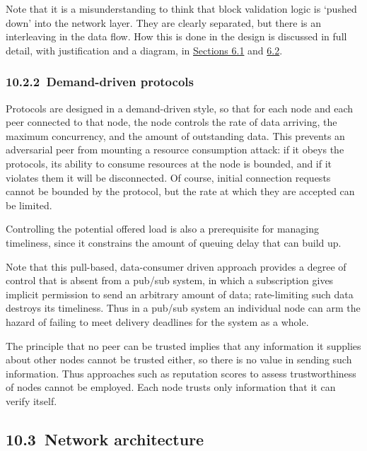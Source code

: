 \documentclass[11pt,a4paper]{article}
\begin{document}
Note that it is a misunderstanding to think that block validation logic
is `pushed down' into the network layer. They are clearly separated, but
there is an interleaving in the data flow. How this is done in the
design is discussed in full detail, with justification and a diagram, in
\protect\hyperlink{consensus-constraints-and-design-decisions}{{Sections
6.1}} and \protect\hyperlink{consensus-components}{{6.2}}.

\hypertarget{demand-driven-protocols}{%
\subsubsection{​10.2.2​~Demand-driven
protocols}\label{demand-driven-protocols}}

Protocols are designed in a demand-driven style, so that for each node
and each peer connected to that node, the node controls the rate of data
arriving, the maximum concurrency, and the amount of outstanding data.
This prevents an adversarial peer from mounting a resource consumption
attack: if it obeys the protocols, its ability to consume resources at
the node is bounded, and if it violates them it will be disconnected. Of
course, initial connection requests cannot be bounded by the protocol,
but the rate at which they are accepted can be limited.

Controlling the potential offered load is also a prerequisite for
managing timeliness, since it constrains the amount of queuing delay
that can build up.

Note that this pull-based, data-consumer driven approach provides a
degree of control that is absent from a pub/sub system, in which a
subscription gives implicit permission to send an arbitrary amount of
data; rate-limiting such data destroys its timeliness. Thus in a pub/sub
system an individual node can arm the hazard of failing to meet delivery
deadlines for the system as a whole.

The principle that no peer can be trusted implies that any information
it supplies about other nodes cannot be trusted either, so there is no
value in sending such information. Thus approaches such as reputation
scores to assess trustworthiness of nodes cannot be employed. Each node
trusts only information that it can verify itself.

\hypertarget{network-architecture}{%
\subsection{​10.3​~Network architecture}\label{network-architecture}}
\end{document}
